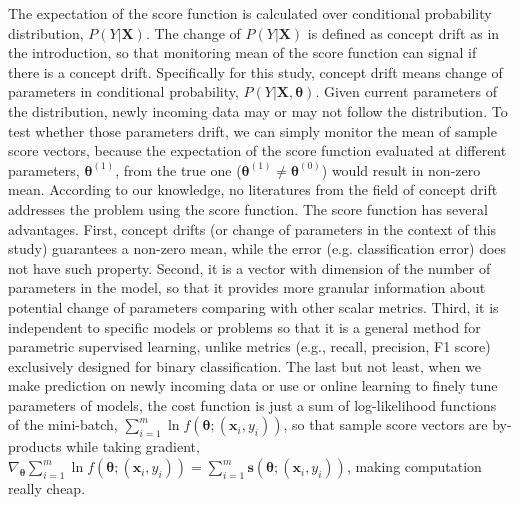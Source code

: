 \documentclass[twoside,11pt]{article}
\begin{document}
The expectation of the score function is calculated over conditional probability distribution, $ P (Y|\bm {X})$. The change of $ P (Y|\bm {X})$ is defined as concept drift as in the introduction, so that monitoring mean of the score function can signal if there is a concept drift. Specifically for this study, concept drift means change of parameters in conditional probability, $P(Y|\bm {X}, \bm { \theta})$. Given current parameters of the distribution, newly incoming data may or may not follow the distribution. To test whether those parameters drift, we can simply monitor the mean of sample score vectors, because the expectation of the score function evaluated at different parameters, $\bm { \theta} ^{ (1)}$, from the true one ($\bm { \theta} ^{ (1)} \neq \bm { \theta} ^{ (0)}$) would result in non-zero mean. According to our knowledge, no literatures from the field of concept drift addresses the problem using the score function. The score function has several advantages. First, concept drifts (or change of parameters in the context of this study) guarantees a non-zero mean, while the error (e.g. classification error) does not have such property. Second, it is a vector with dimension of the number of parameters in the model, so that it provides more granular information about potential change of parameters comparing with other scalar metrics. Third, it is independent to specific models or problems so that it is a general method for parametric supervised learning, unlike  metrics (e.g., recall, precision, F1 score) exclusively designed for binary classification. The last but not least, when we make prediction on newly incoming data or use  or online learning to finely tune parameters of models, the cost function is just a sum of log-likelihood functions of the mini-batch, $\sum _{i=1} ^{m} \ln f(\bm{\theta}; (\bm {x}_i, y_i))$, so that sample score vectors are by-products while taking gradient, $\nabla _{\bm { \theta}} \sum _{i=1} ^{m} \ln f(\bm{\theta}; (\bm {x}_i, y_i)) = \sum_{i=1}^{m} \bm{s}(\bm { \theta};(\bm {x}_i, y_i))$, making computation really cheap. 
\end{document}
